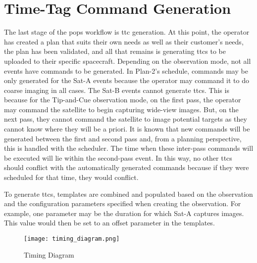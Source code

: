 \section{Time-Tag Command Generation}\label{sec:ttc-gen}

The last stage of the \gls{pops} workflow is \gls{ttc} generation.  At this
point, the operator has created a plan that suits their own needs as well as
their customer’s needs, the plan has been validated, and all that remains is
generating \glspl{ttc} to be uploaded to their specific spacecraft.  Depending
on the observation mode, not all events have commands to be generated. In
Plan-2's schedule, commands may be only generated for the Sat-A events because
the operator may command it to do coarse imaging in all cases. The Sat-B events cannot
generate \glspl{ttc}. This is because for the Tip-and-Cue observation mode, on
the first pass, the operator may command the satellite to begin capturing
wide-view images.  But, on the next pass, they cannot command the satellite to
image potential targets as they cannot know where they will be a priori. It is
known that new commands will be generated between the first and second pass
and, from a planning perspective, this is handled with the scheduler. The time
when these inter-pass commands will be executed will lie within the second-pass
event. In this way, no other \glspl{ttc} should conflict with the automatically
generated commands because if they were scheduled for that time, they would
conflict. 

To generate \glspl{ttc}, templates are combined and populated based on the
observation and the configuration parameters specified when creating the
observation. For example, one parameter may be the duration for which Sat-A
captures images. This value would then be set to an offset parameter in the
templates. 

\begin{figure}[h] 
    \centering
    \texttt{[image: timing\_diagram.png]} 
    \caption{Timing Diagram}
    \label{fig:timing-diagram} 
\end{figure}

